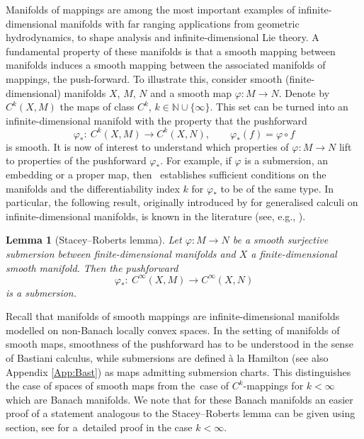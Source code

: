 \documentclass[pdftex]{sigma}
\numberwithin{equation}{section}
\newtheorem*{Lemma*}{Lemma}
\newcommand{\N}{\ensuremath{\mathbb{N}}}
\begin{document}
Manifolds of mappings are among the most important examples of infinite-dimensional manifolds with far ranging applications from geometric hydrodynamics, to shape analysis and infinite-dimensional Lie theory.
A fundamental property of these manifolds is that a smooth mapping between manifolds induces a smooth mapping between the associated manifolds of mappings, the push-forward.
To illustrate this, consider smooth (finite-dimensional) manifolds $X$, $M$, $N$ and a smooth map $\varphi \colon M \rightarrow N$.
Denote by $C^k(X,M)$ the maps of class $C^k$, $k\in \N \cup \{\infty\}$.
This set can be turned into an infinite-dimensional manifold with the property that the pushforward
\begin{displaymath}
\varphi_\ast \colon \ C^k (X,M) \rightarrow C^k (X,N), \qquad \varphi_\ast (f)= \varphi \circ f
\end{displaymath}
is smooth.
It is now of interest to understand which properties of $\varphi \colon M \rightarrow N$ lift to properties of the pushforward $\varphi_\ast$.
For example, if $\varphi$ is a submersion, an embedding or a proper map, then~\mbox{\cite[Theorem E]{AaGaS20}} establishes sufficient conditions on the manifolds and the differentiability index $k$ for $\varphi_\ast$ to be of the same type. In particular, the following result, originally introduced by \cite[Corollary 5.2]{stacey2013smooth} for generalised calculi on infinite-dimensional manifolds, is known in the literature (see, e.g., \cite[Lemma 2.24]{Sch23}).

\begin{Lemma*}[Stacey--Roberts lemma] Let $\varphi \colon M \rightarrow N$ be a smooth surjective submersion between finite-dimensional manifolds and $X$ a finite-dimensional smooth manifold. Then the pushforward
\begin{equation*}
 \varphi_\ast \colon\ C^\infty (X,M) \rightarrow C^\infty (X,N)
\end{equation*}
is a submersion.
\end{Lemma*}

Recall that manifolds of smooth mappings are infinite-dimensional manifolds modelled on non-Banach locally convex spaces.
In the setting of manifolds of smooth maps, smoothness of the pushforward has to be understood in the sense of Bastiani calculus, while submersions are defined à la Hamilton \cite[Defenition~4.4.8]{Ham82} (see also Appendix \ref{App:Bast}) as maps admitting submersion charts.
This distinguishes the case of spaces of smooth maps from the~case of $C^k$-mappings for $k<\infty$ which are Banach manifolds. We note that for these Banach manifolds an easier proof of a statement analogous to the Stacey--Roberts lemma can be given using section, see \cite{AaGaS20} for a~detailed proof in the case $k<\infty$.
\end{document}

